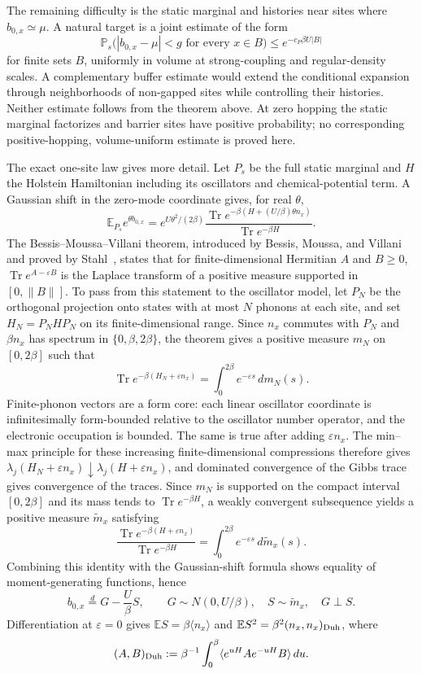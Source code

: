 \documentclass[11pt]{article}
\theoremstyle{definition}
\theoremstyle{remark}
\begin{document}
The remaining difficulty is the static marginal and histories near sites where $b_{0,x}\simeq\mu$. A natural target is a joint estimate of the form
\[
 \mathbb P_s\bigl(|b_{0,x}-\mu|<g\text{ for every }x\in B\bigr)
 \leq e^{-c_P\beta U|B|}
\]
for finite sets $B$, uniformly in volume at strong-coupling and regular-density scales. A complementary buffer estimate would extend the conditional expansion through neighborhoods of non-gapped sites while controlling their histories. Neither estimate follows from the theorem above. At zero hopping the static marginal factorizes and barrier sites have positive probability; no corresponding positive-hopping, volume-uniform estimate is proved here.

The exact one-site law gives more detail. Let $P_s$ be the full static marginal and $H$ the Holstein Hamiltonian including its oscillators and chemical-potential term. A Gaussian shift in the zero-mode coordinate gives, for real $\theta$,
\[
 \mathbb E_{P_s}e^{\theta b_{0,x}}=e^{U\theta^2/(2\beta)}
 \frac{\operatorname{Tr}e^{-\beta(H+(U/\beta)\theta n_x)}}{\operatorname{Tr}e^{-\beta H}}.
\]
The Bessis--Moussa--Villani theorem, introduced by Bessis, Moussa, and Villani~\cite{bmv} and proved by Stahl~\cite{stahl}, states that for finite-dimensional Hermitian $A$ and $B\geq0$, $\operatorname{Tr}e^{A-\varepsilon B}$ is the Laplace transform of a positive measure supported in $[0,\|B\|]$. To pass from this statement to the oscillator model, let $P_N$ be the orthogonal projection onto states with at most $N$ phonons at each site, and set $H_N=P_NHP_N$ on its finite-dimensional range. Since $n_x$ commutes with $P_N$ and $\beta n_x$ has spectrum in $\{0,\beta,2\beta\}$, the theorem gives a positive measure $m_N$ on $[0,2\beta]$ such that
\[
 \operatorname{Tr}e^{-\beta(H_N+\varepsilon n_x)}=\int_0^{2\beta}e^{-\varepsilon s}\,dm_N(s).
\]
Finite-phonon vectors are a form core: each linear oscillator coordinate is infinitesimally form-bounded relative to the oscillator number operator, and the electronic occupation is bounded. The same is true after adding $\varepsilon n_x$. The min--max principle for these increasing finite-dimensional compressions therefore gives $\lambda_j(H_N+\varepsilon n_x)\downarrow\lambda_j(H+\varepsilon n_x)$, and dominated convergence of the Gibbs trace gives convergence of the traces. Since $m_N$ is supported on the compact interval $[0,2\beta]$ and its mass tends to $\operatorname{Tr}e^{-\beta H}$, a weakly convergent subsequence yields a positive measure $\widetilde m_x$ satisfying
\[
 \frac{\operatorname{Tr}e^{-\beta(H+\varepsilon n_x)}}{\operatorname{Tr}e^{-\beta H}}
 =\int_0^{2\beta}e^{-\varepsilon s}\,d\widetilde m_x(s).
\]
Combining this identity with the Gaussian-shift formula shows equality of moment-generating functions, hence
\[
 b_{0,x}\overset{d}=G-\frac{U}{\beta}S,\qquad G\sim N(0,U/\beta),\quad S\sim\widetilde m_x,\quad G\perp S.
\]
Differentiation at $\varepsilon=0$ gives $\mathbb E S=\beta\langle n_x\rangle$ and $\mathbb E S^2=\beta^2(n_x,n_x)_{\rm Duh}$, where
\[
 (A,B)_{\rm Duh}:=\beta^{-1}\int_0^\beta\langle e^{uH}Ae^{-uH}B\rangle\,du.
\]
\end{document}
